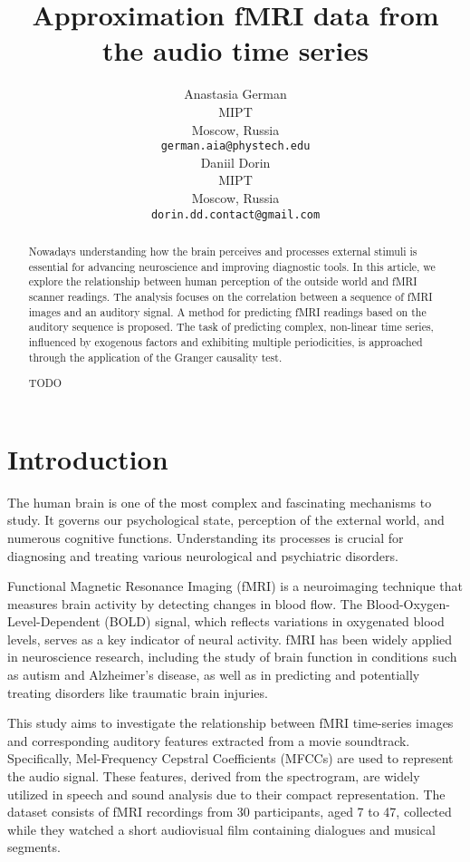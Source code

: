 \documentclass{article}
\title{Approximation fMRI data from the audio time series}
\author{%
  Anastasia German\\
  MIPT\\
  Moscow, Russia\\
  \texttt{german.aia@phystech.edu}\\
  \And
  Daniil Dorin\\
  MIPT\\
  Moscow, Russia\\
  \texttt{dorin.dd.contact@gmail.com}\\
}
\begin{document}
\maketitle

\begin{abstract}
   Nowadays understanding how the brain perceives and processes external stimuli is essential for advancing neuroscience and improving diagnostic tools. In this article, we explore the relationship between human perception of the outside world and fMRI scanner readings. The analysis focuses on the correlation between a sequence of fMRI images and an auditory signal. A method for predicting fMRI readings based on the auditory sequence is proposed. The task of predicting complex, non-linear time series, influenced by exogenous factors and exhibiting multiple periodicities, is approached through the application of the Granger causality test.


    
    TODO
\end{abstract}

\section{Introduction}\label{sec:intro}

The human brain is one of the most complex and fascinating mechanisms to study. It governs our psychological state, perception of the external world, and numerous cognitive functions. Understanding its processes is crucial for diagnosing and treating various neurological and psychiatric disorders.

Functional Magnetic Resonance Imaging (fMRI)\cite{article1} is a neuroimaging technique that measures brain activity by detecting changes in blood flow. The Blood-Oxygen-Level-Dependent (BOLD) signal\cite{article2}, which reflects variations in oxygenated blood levels, serves as a key indicator of neural activity. fMRI has been widely applied in neuroscience research, including the study of brain function in conditions such as autism and Alzheimer's disease\cite{article3}, as well as in predicting and potentially treating disorders like traumatic brain injuries.

This study aims to investigate the relationship between fMRI time-series images and corresponding auditory features extracted from a movie soundtrack. Specifically, Mel-Frequency Cepstral Coefficients (MFCCs) \cite{article4} are used to represent the audio signal. These features, derived from the spectrogram, are widely utilized in speech and sound analysis due to their compact representation. The dataset \cite{article5} consists of fMRI recordings from 30 participants, aged 7 to 47, collected while they watched a short audiovisual film containing dialogues and musical segments.
\end{document}
